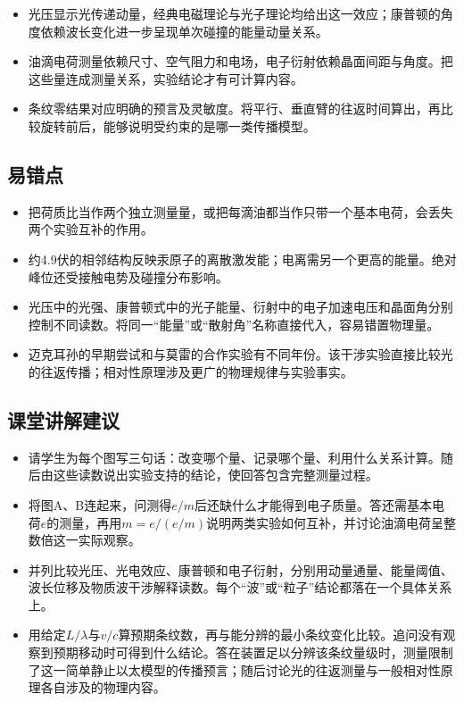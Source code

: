\documentclass[UTF8,fontset=fandol,a4paper,11pt]{ctexart}
\begin{document}
\begin{itemize}
\item 光压显示光传递动量，经典电磁理论与光子理论均给出这一效应；康普顿的角度依赖波长变化进一步呈现单次碰撞的能量动量关系。
\item 油滴电荷测量依赖尺寸、空气阻力和电场，电子衍射依赖晶面间距与角度。把这些量连成测量关系，实验结论才有可计算内容。
\item 条纹零结果对应明确的预言及灵敏度。将平行、垂直臂的往返时间算出，再比较旋转前后，能够说明受约束的是哪一类传播模型。
\end{itemize}



\subsection*{易错点}

\begin{itemize}
\item 把荷质比当作两个独立测量量，或把每滴油都当作只带一个基本电荷，会丢失两个实验互补的作用。
\item 约4.9伏的相邻结构反映汞原子的离散激发能；电离需另一个更高的能量。绝对峰位还受接触电势及碰撞分布影响。
\item 光压中的光强、康普顿式中的光子能量、衍射中的电子加速电压和晶面角分别控制不同读数。将同一“能量”或“散射角”名称直接代入，容易错置物理量。
\item 迈克耳孙的早期尝试和与莫雷的合作实验有不同年份。该干涉实验直接比较光的往返传播；相对性原理涉及更广的物理规律与实验事实。
\end{itemize}



\subsection*{课堂讲解建议}

\begin{itemize}
\item 请学生为每个图写三句话：改变哪个量、记录哪个量、利用什么关系计算。随后由这些读数说出实验支持的结论，使回答包含完整测量过程。
\item 将图A、B连起来，问测得$e/m$后还缺什么才能得到电子质量。答还需基本电荷$e$的测量，再用$m=e/(e/m)$说明两类实验如何互补，并讨论油滴电荷呈整数倍这一实际观察。
\item 并列比较光压、光电效应、康普顿和电子衍射，分别用动量通量、能量阈值、波长位移及物质波干涉解释读数。每个“波”或“粒子”结论都落在一个具体关系上。
\item 用给定$L/\lambda$与$v/c$算预期条纹数，再与能分辨的最小条纹变化比较。追问没有观察到预期移动时可得到什么结论。答在装置足以分辨该条纹量级时，测量限制了这一简单静止以太模型的传播预言；随后讨论光的往返测量与一般相对性原理各自涉及的物理内容。
\end{itemize}
\end{document}
